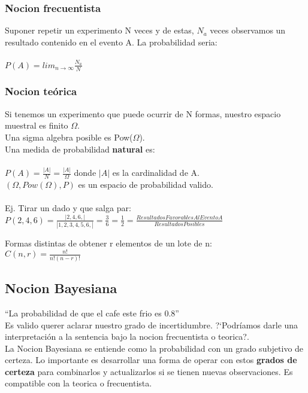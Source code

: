 \subsubsection{Nocion frecuentista}
Suponer repetir un experimento N veces y de estas, $N_a$ veces observamos un resultado contenido en el evento A. La probabilidad seria:\\ \\
$P(A) = lim_{n \rightarrow \infty} \frac{N_a}{N}$

\subsubsection{Nocion te\'orica}
Si tenemos un experimento que puede ocurrir de N formas, nuestro espacio muestral es finito $\Omega$.\\
Una sigma algebra posible es Pow($\Omega$).\\
Una medida de probabilidad \textbf{natural} es:\\ \\
$P(A) = \frac{|A|}{N} = \frac{|A|}{\Omega}$ donde $|A|$ es la cardinalidad de A.\\
$(\Omega, Pow(\Omega), P)$ es un espacio de probabilidad valido.\\ \\
Ej. Tirar un dado y que salga par:\\
$P({2,4,6}) = \frac{|{2,4,6,}|}{|{1,2,3,4,5,6,}|} = \frac{3}{6} = \frac{1}{2} = \frac{ResultadosFavorablesAlEventoA}{ResultadosPosibles}$

Formas distintas de obtener r elementos de un lote de n:\\
$C(n,r) = \frac{n!}{n!(n-r)!}$

\subsection{Nocion Bayesiana}
``La probabilidad de que el cafe este frio es 0.8''\\
Es valido querer aclarar nuestro grado de incertidumbre. ?`Podr\'iamos darle una interpretaci\'on a la sentencia bajo la nocion frecuentista o teorica?.\\
La Nocion Bayesiana se entiende como la probabilidad con un grado subjetivo de certeza. Lo importante es desarrollar una forma de operar con estos \textbf{grados de certeza} para combinarlos y actualizarlos si se tienen nuevas observaciones. Es compatible con la teorica o frecuentista.


